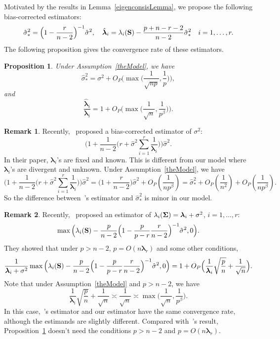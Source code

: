 \documentclass[review]{elsarticle}
\newcommand{\bfsym}[1]{\ensuremath{\boldsymbol{#1}}}
\def\blambda {\bfsym {\lambda}}        \def\bLambda {\bfsym {\Lambda}}
\theoremstyle{plain}
\newtheorem{proposition}{\quad\quad Proposition}
\theoremstyle{definition}
\newtheorem{remark}{\quad\quad Remark}
\theoremstyle{remark}
\begin{document}
Motivated by the results in Lemma~\ref{eigenconsisLemma}, we propose the following bias-corrected estimators:
$$
\hat{\sigma}_*^2= \Big(1-\frac{r}{n-2}\Big)^{-1} \hat{\sigma}^2,
\quad
\hat{\blambda}_i=\lambda_i(\BS)-\frac{p+n-r-2}{n-2}\hat{\sigma}_*^2
\quad i=1,\ldots,r.
$$
The following proposition gives the convergence rate of these estimators.
\begin{proposition}\label{varianceEstimation}
    Under Assumption~\ref{theModel}, we have %
    \begin{equation}\label{varianceEstimationPropResult1}
    \hat{\sigma}_*^2=\sigma^2 + O_P\Big(\max \big(\frac{1}{\sqrt{np}},\frac{1}{p}\big)\Big),
    \end{equation}
    and
    \begin{equation}\label{varianceEstimationPropResult2}
        \frac{\hat{\blambda}_i}{\blambda_i}
        =
        1+
        O_P\Big(\max\big(\frac{1}{\sqrt{n}},\frac{1}{p^{\beta}}\big)\Big).
    \end{equation}
\end{proposition}
\begin{remark}
Recently,~\cite{Passemier2015} proposed a bias-corrected estimator of $\sigma^2$:
$$
\Big(1+\frac{1}{n-2}\big(r+\hat{\sigma}^2\sum_{i=1}^r \frac{1}{\blambda_i}\big)\Big)\hat{\sigma}^2.
$$
In their paper, $\blambda_i$'s are fixed and known.
This is different from our model where $\blambda_i$'s are divergent and unknown.
Under Assumption~\ref{theModel}, we have
$$
\Big(1+\frac{1}{n-2}\big(r+\hat{\sigma}^2\sum_{i=1}^r \frac{1}{\blambda_i}\big)\Big)\hat{\sigma}^2
=
    \Big(1+\frac{r}{n-2}\Big)\hat{\sigma}^2+O_P(\frac{1}{np^{\beta}})
    =
    \hat{\sigma}_*^2
    +O_P(\frac{1}{n^2})+O_P(\frac{1}{np^{\beta}}).
$$
So the difference between~\cite{Passemier2015}'s estimator and $\hat{\sigma}_*^2$ is minor in our model.
\end{remark}
\begin{remark}
    Recently,~\cite{Fan2015Asymptotics} proposed an estimator of
    $\lambda_i(\bSigma)=\blambda_i+\sigma^2$, $i=1,\ldots, r$:
    $$
    \max\Big(\lambda_i(\mathbf{S})-\frac{p}{n-2}\Big(1-\frac{p}{p-r}\frac{r}{n-2}\Big)^{-1}\hat{\sigma}^2,0\Big).
    $$
    They showed that under $p>n-2$, $p=O(n\blambda_r)$ and some other conditions,
    $$
    \frac{1}{\blambda_i+\sigma^2}\max\Big(\lambda_i(\BS)-\frac{p}{n-2}\Big(1-\frac{p}{p-r}\frac{r}{n-2}\Big)^{-1}\hat{\sigma}^2,0\Big)
    =1+O_P\Big(\frac{1}{\blambda_i}\sqrt{\frac{p}{n}}+\frac{1}{\sqrt{n}}\Big).
    $$
    Note that under Assumption~\ref{theModel} and $p>n-2$, we have
    $$
\frac{1}{\blambda_i}\sqrt{\frac{p}{n}}+\frac{1}{\sqrt{n}}\asymp
\frac{1}{\sqrt{n}}
\asymp
        \max\big(\frac{1}{\sqrt{n}},\frac{1}{p^{\beta}}\big).
    $$
    In this case,~\cite{Fan2015Asymptotics}'s estimator and our estimator have the same convergence rate, although the estimands are slightly different.
    Compared with~\cite{Fan2015Asymptotics}'s result, Proposition~\ref{varianceEstimation} doesn't need the conditions $p>n-2$ and $p=O(n\blambda_r)$.
\end{remark}
\end{document}
